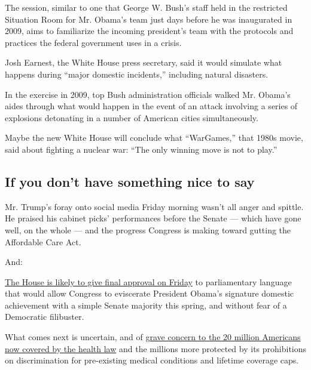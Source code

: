 The session, similar to one that George W. Bush's staff held in the
restricted Situation Room for Mr. Obama's team just days before he was
inaugurated in 2009, aims to familiarize the incoming president's team
with the protocols and practices the federal government uses in a
crisis.

Josh Earnest, the White House press secretary, said it would simulate
what happens during ``major domestic incidents,'' including natural
disasters.

In the exercise in 2009, top Bush administration officials walked Mr.
Obama's aides through what would happen in the event of an attack
involving a series of explosions detonating in a number of American
cities simultaneously.

Maybe the new White House will conclude what ``WarGames,'' that 1980s
movie, said about fighting a nuclear war: ``The only winning move is not
to play.''

\hypertarget{if-you-dont-have-something-nice-to-say}{%
\subsection{If you don't have something nice to
say}\label{if-you-dont-have-something-nice-to-say}}

Mr. Trump's foray onto social media Friday morning wasn't all anger and
spittle. He praised his cabinet picks' performances before the Senate
--- which have gone well, on the whole --- and the progress Congress is
making toward gutting the Affordable Care Act.

And:

\href{https://www.nytimes.com/2017/01/12/us/politics/congress-affordable-care-act.html?hp\&action=click\&pgtype=Homepage\&clickSource=story-heading\&module=first-column-region\&region=top-news\&WT.nav=top-news}{The
House is likely to give final approval on Friday} to parliamentary
language that would allow Congress to eviscerate President Obama's
signature domestic achievement with a simple Senate majority this
spring, and without fear of a Democratic filibuster.

What comes next is uncertain, and of
\href{https://www.nytimes.com/2017/01/11/upshot/trumps-obamacare-plan-still-optimistic-still-vague.html?hp\&action=click\&pgtype=Homepage\&clickSource=story-heading\&module=first-column-region\&region=top-news\&WT.nav=top-news}{grave
concern to the 20 million Americans now covered by the health law} and
the millions more protected by its prohibitions on discrimination for
pre-existing medical conditions and lifetime coverage caps.


